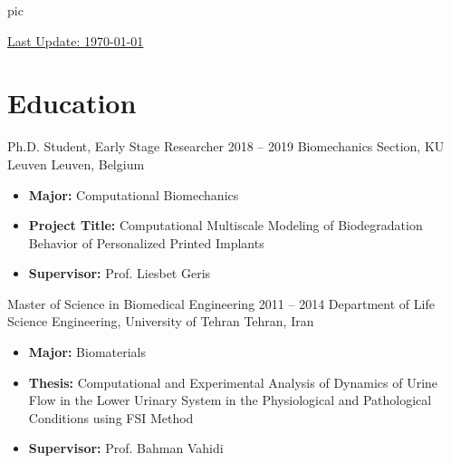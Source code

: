 \documentclass{cv}
\begin{document}
{{pic}}


\noindent
{\footnotesize  \underline{Last Update: \today{}}}





\section{Education}

\longdatedsubsection
{Ph.D. Student, Early Stage Researcher}
{2018 -- 2019} 
{Biomechanics Section, KU Leuven} 
{Leuven, Belgium} 

\begin{itemize}

\item 
\textbf{Major:} Computational Biomechanics

\item
\textbf{Project Title:} Computational Multiscale Modeling of Biodegradation Behavior of Personalized Printed Implants

\item
\textbf{Supervisor:} Prof. Liesbet Geris

\end{itemize}

\longdatedsubsection
{Master of Science in Biomedical Engineering}
{2011 -- 2014} 
{Department of Life Science Engineering, University of Tehran} 
{Tehran, Iran} 

\begin{itemize}

\item 
\textbf{Major:} Biomaterials

\item
\textbf{Thesis:} Computational and Experimental Analysis of Dynamics of Urine Flow in the Lower Urinary System in the Physiological and Pathological Conditions using FSI Method

\item
\textbf{Supervisor:} Prof. Bahman Vahidi


\end{itemize}
\end{document}
